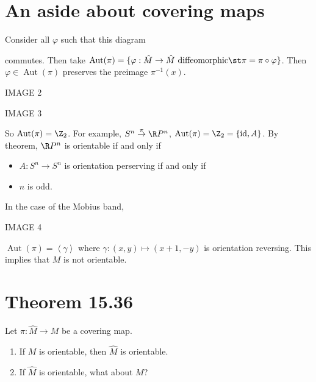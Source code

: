 \documentclass[11pt]{article}
\begin{document}
\section*{An aside about covering maps}
\label{sec:org77b2127}
Consider all \(\varphi\) such that this diagram\\
commutes. Then take \(\operatorname{Aut}(\pi)=\{\varphi:\hat{M}\to\hat{M}\text{ diffeomorphic}\st \pi=\pi\circ\varphi\}\). Then \(\varphi\in\operatorname{Aut}(\pi)\) preserves the preimage \(\pi^{-1}(x)\).\\
\begin{center}
IMAGE 2\\
\end{center}
\begin{center}
IMAGE 3\\
\end{center}
So \(\operatorname{Aut}(\pi)=\Z_{2}\). For example, \(S^{n}\overset{\pi}{\to}\R P^{n}\), \(\operatorname{Aut}(\pi)=\Z_{2}=\{\operatorname{id},A\}\). By theorem, \(\R P^{n}\) is orientable if and only if\\
\begin{itemize}
\item \(A:S^{n}\to S^{n}\) is orientation perserving if and only if\\
\item \(n\) is odd.\\
\end{itemize}

In the case of the Mobius band,\\
\begin{center}
IMAGE 4\\
\end{center}
\(\operatorname{Aut}(\pi)=\left\langle \gamma \right\rangle\) where \(\gamma:(x,y)\mapsto(x+1,-y)\) is orientation reversing. This implies that \(M\) is not orientable.\\
\section*{Theorem 15.36}
\label{sec:org6a47bf4}
Let \(\pi:\hat{M}\to M\) be a covering map.\\
\begin{enumerate}
\item If \(M\) is orientable, then \(\hat{M}\) is orientable.\\
\item If \(\hat{M}\) is orientable, what about \(M\)?\\
\end{enumerate}
\end{document}
